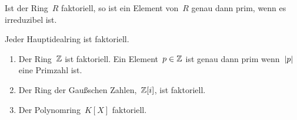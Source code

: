 \begin{proposition}
  Ist der Ring~$R$ faktoriell, so ist ein Element von~$R$ genau dann prim, wenn es irreduzibel ist.
\end{proposition}

\begin{proposition}
  Jeder Hauptidealring ist faktoriell.
\end{proposition}

\begin{example}
  \leavevmode
  \begin{enumerate}
    \item
      Der Ring~$\mathbb{Z}$ ist faktoriell.
      Ein Element~$p \in \mathbb{Z}$ ist genau dann prim wenn~$\lvert p\rvert$ eine Primzahl ist.
    \item
      Der Ring der Gaußschen Zahlen,~$\mathbb{Z}[i]$, ist faktoriell.
    \item
      Der Polynomring~$K[X]$ faktoriell.
  \end{enumerate}
\end{example}

